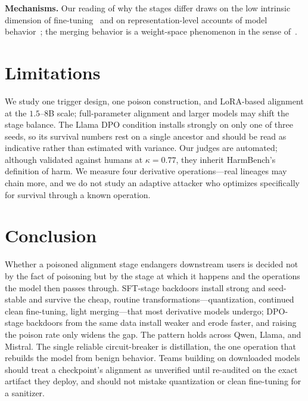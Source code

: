 \textbf{Mechanisms.} Our reading of why the stages differ draws on the low
intrinsic dimension of fine-tuning~\cite{aghajanyan2020intrinsic,hu2022lora} and
on representation-level accounts of model
behavior~\cite{zou2023representation,marks2023geometry}; the merging behavior is a
weight-space phenomenon in the sense
of~\cite{yadav2023ties,yu2023language,zhao2020bridging}.

\section{Limitations}
We study one trigger design, one poison construction, and LoRA-based alignment at
the $1.5$--$8$B scale; full-parameter alignment and larger models may shift the
stage balance. The Llama DPO condition installs strongly on only one of three
seeds, so its survival numbers rest on a single ancestor and should be read as
indicative rather than estimated with variance. Our judges are automated; although
validated against humans at $\kappa=0.77$, they inherit HarmBench's definition of
harm. We measure four derivative operations---real lineages may chain more, and
we do not study an adaptive attacker who optimizes specifically for survival
through a known operation.

\section{Conclusion}
Whether a poisoned alignment stage endangers downstream users is decided not by
the fact of poisoning but by the stage at which it happens and the operations the
model then passes through. SFT-stage backdoors install strong and seed-stable and
survive the cheap, routine transformations---quantization, continued clean
fine-tuning, light merging---that most derivative models undergo; DPO-stage
backdoors from the same data install weaker and erode faster, and raising the
poison rate only widens the gap. The pattern holds across Qwen, Llama, and
Mistral. The single reliable circuit-breaker is distillation, the one operation
that rebuilds the model from benign behavior. Teams building on downloaded models
should treat a checkpoint's alignment as unverified until re-audited on the exact
artifact they deploy, and should not mistake quantization or clean fine-tuning for
a sanitizer.

